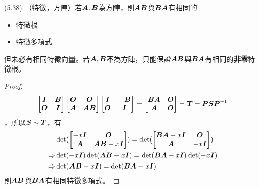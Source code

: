 \item \begin{theorem}{(5.38)} （特徵，方陣）若$\boldsymbol{A}, \boldsymbol{B}$為方陣，則$\boldsymbol{AB}$與$\boldsymbol{BA}$有相同的
	\begin{itemize}
		\item 特徵根
		\item 特徵多項式
	\end{itemize}
	但未必有相同特徵向量。若$\boldsymbol{A}, \boldsymbol{B}$\textbf{不}為方陣，只能保證$\boldsymbol{AB}$與$\boldsymbol{BA}$有相同的\textbf{非零}特徵根。 \\
	\begin{proof} \begin{equation}
			\begin{bmatrix}
				\boldsymbol{I} & \boldsymbol{B} \\
				\boldsymbol{O} & \boldsymbol{I}
			\end{bmatrix}
			\begin{bmatrix}
				\boldsymbol{O} & \boldsymbol{O} \\
				\boldsymbol{A} & \boldsymbol{AB}
			\end{bmatrix}
			\begin{bmatrix}
				\boldsymbol{I} & \boldsymbol{-B} \\
				\boldsymbol{O} & \boldsymbol{I}
			\end{bmatrix} = 
			\begin{bmatrix}
				\boldsymbol{BA} & \boldsymbol{O} \\
				\boldsymbol{A} & \boldsymbol{O}
			\end{bmatrix} = \boldsymbol{T} = \boldsymbol{P}\boldsymbol{S}\boldsymbol{P}^{\mathsf{-1}}
		\end{equation}，所以$\boldsymbol{S} \sim \boldsymbol{T}$，有\begin{equation}
			\begin{aligned} 
				& \det(\begin{bmatrix}
					-x\boldsymbol{I} & \boldsymbol{O} \\
					\boldsymbol{A} & \boldsymbol{AB} - x\boldsymbol{I}
				\end{bmatrix}) = 
				\det(\begin{bmatrix}
					\boldsymbol{BA} - x\boldsymbol{I} & \boldsymbol{O} \\
					\boldsymbol{A} & -x\boldsymbol{I}
				\end{bmatrix}) \\
				\Rightarrow & \det(-x\boldsymbol{I})\det(\boldsymbol{AB} - x\boldsymbol{I}) = \det(\boldsymbol{BA} - x\boldsymbol{I})\det(-x\boldsymbol{I}) \\
				\Rightarrow & \det(\boldsymbol{AB} - x\boldsymbol{I}) = \det(\boldsymbol{BA} - x\boldsymbol{I})
			\end{aligned}
		\end{equation} 則$\boldsymbol{AB}$與$\boldsymbol{BA}$有相同特徵多項式。
	\end{proof}
\end{theorem}

